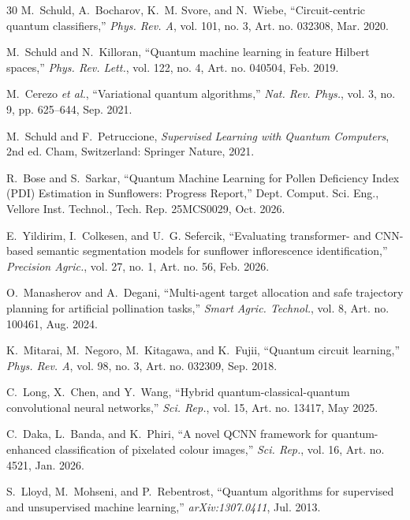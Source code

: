 \documentclass{ieeeaccess}
\begin{document}
\begin{thebibliography}{30}
M.~Schuld, A.~Bocharov, K.~M. Svore, and N.~Wiebe, ``Circuit-centric quantum classifiers,'' \textit{Phys. Rev. A}, vol. 101, no. 3, Art. no. 032308, Mar. 2020.

M.~Schuld and N.~Killoran, ``Quantum machine learning in feature Hilbert spaces,'' \textit{Phys. Rev. Lett.}, vol. 122, no. 4, Art. no. 040504, Feb. 2019.

M.~Cerezo \textit{et al.}, ``Variational quantum algorithms,'' \textit{Nat. Rev. Phys.}, vol. 3, no. 9, pp. 625--644, Sep. 2021.

M.~Schuld and F.~Petruccione, \textit{Supervised Learning with Quantum Computers}, 2nd ed. Cham, Switzerland: Springer Nature, 2021.

R.~Bose and S.~Sarkar, ``Quantum Machine Learning for Pollen Deficiency Index (PDI) Estimation in Sunflowers: Progress Report,'' Dept. Comput. Sci. Eng., Vellore Inst. Technol., Tech. Rep. 25MCS0029, Oct. 2026.

E.~Yildirim, I.~Colkesen, and U.~G. Sefercik, ``Evaluating transformer- and CNN-based semantic segmentation models for sunflower inflorescence identification,'' \textit{Precision Agric.}, vol. 27, no. 1, Art. no. 56, Feb. 2026.

O.~Manasherov and A.~Degani, ``Multi-agent target allocation and safe trajectory planning for artificial pollination tasks,'' \textit{Smart Agric. Technol.}, vol. 8, Art. no. 100461, Aug. 2024.

K.~Mitarai, M.~Negoro, M.~Kitagawa, and K.~Fujii, ``Quantum circuit learning,'' \textit{Phys. Rev. A}, vol. 98, no. 3, Art. no. 032309, Sep. 2018.

C.~Long, X.~Chen, and Y.~Wang, ``Hybrid quantum-classical-quantum convolutional neural networks,'' \textit{Sci. Rep.}, vol. 15, Art. no. 13417, May 2025.

C.~Daka, L.~Banda, and K.~Phiri, ``A novel QCNN framework for quantum-enhanced classification of pixelated colour images,'' \textit{Sci. Rep.}, vol. 16, Art. no. 4521, Jan. 2026.

S.~Lloyd, M.~Mohseni, and P.~Rebentrost, ``Quantum algorithms for supervised and unsupervised machine learning,'' \textit{arXiv:1307.0411}, Jul. 2013.


\end{thebibliography}
\end{document}
